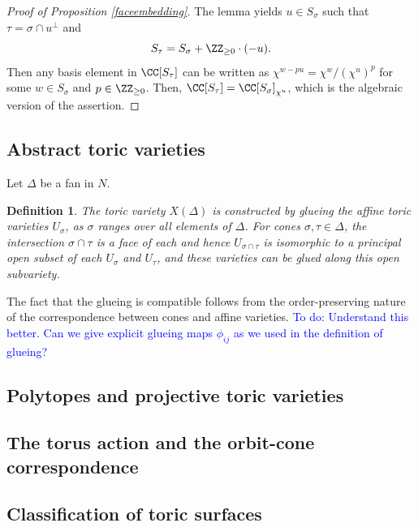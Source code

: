 \documentclass[12pt]{amsart}
\newcommand{\todo}[1]{\noindent  \textcolor{blue}{To do: #1}}
\theoremstyle{plain}
\newtheorem{definition}[theorem]{Definition}
\begin{document}
\begin{proof}[Proof of Proposition \ref{faceembedding}]
The lemma yields $u \in S_\sigma$ such that $\tau=\sigma\cap u^\perp$ and
$$S_\tau = S_\sigma + \ZZ_{\ge 0} \cdot (-u).$$
Then any basis element in $\CC[S_\tau]$ can be written as $\chi^{w - p u} = \chi^w / (\chi^u)^p$ for some $w \in S_\sigma$ and $p \in \ZZ_{\ge 0}$.
Then, $\CC[S_\tau] = \CC[S_\sigma]_{\chi^u}$, which is the algebraic version of the assertion.
\end{proof}


\subsection{Abstract toric varieties}
Let $\Delta$ be a fan in $N$.

\begin{definition}
The toric variety $X(\Delta)$ is constructed by glueing the affine toric varieties $U_\sigma$, as $\sigma$ ranges over all elements of $\Delta$.
For cones $\sigma, \tau \in \Delta$, the intersection $\sigma \cap \tau$ is a face of each and hence $U_{\sigma \cap \tau}$ is isomorphic to a principal open subset of each $U_\sigma$ and $U_\tau$, and these varieties can be glued along this open subvariety.
\end{definition}

The fact that the glueing is compatible follows from the order-preserving nature of the correspondence between cones and affine varieties.
\todo{Understand this better. Can we give explicit glueing maps $\phi_{ij}$ as we used in the definition of glueing?}



\subsection{Polytopes and projective toric varieties}



\subsection{The torus action and the orbit-cone correspondence}



\subsection{Classification of toric surfaces}
\end{document}
